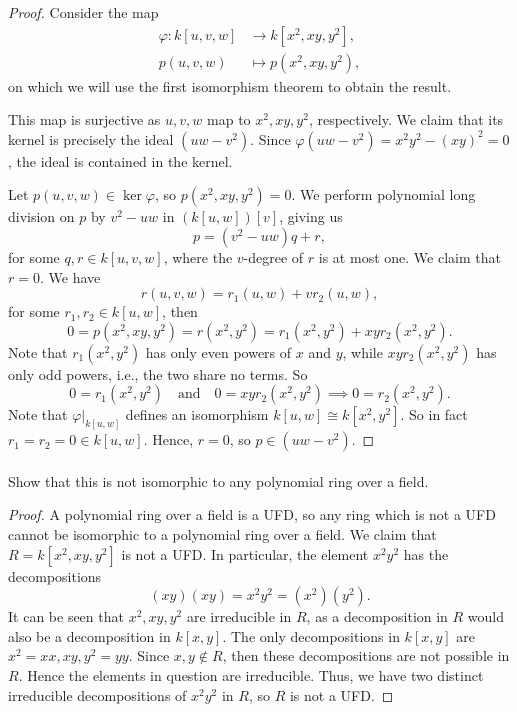 \documentclass[12pt]{article}
\newlength{\myparskip}
\newenvironment{fullbox}{\begin{lrbox}{\savefullbox}\begin{minipage}{\dimexpr\textwidth-2\fboxsep\relax}\setlength{\parskip}{\myparskip}}{\end{minipage}\end{lrbox}\framebox[\textwidth]{\usebox{\savefullbox}}}
\newenvironment{pbox}[1][]{\begin{fullbox}\ifx#1\empty\else\paragraph{#1}\fi}{\end{fullbox}}
\newcommand{\isp}[1]{\quad\text{#1}\quad}
\renewcommand{\phi}{\varphi}
\newcommand{\<}{\langle}
\renewcommand{\>}{\rangle}
\newcommand{\isom}{\cong}
\begin{document}
\begin{proof}
    Consider the map
    \begin{align*}
        \phi : k[u, v, w] &\to k[x^2, xy, y^2], \\
            p(u, v, w) &\mapsto p(x^2, xy, y^2),
    \end{align*}
    on which we will use the first isomorphism theorem to obtain the result.

    This map is surjective as $u, v, w$ map to $x^2, xy, y^2$, respectively. We claim that its kernel is precisely the ideal $(uw - v^2)$. Since $\phi(uw - v^2) = x^2y^2 - (xy)^2 = 0$, the ideal is contained in the kernel.
    
    Let $p(u, v, w) \in \ker\phi$, so $p(x^2, xy, y^2) = 0$. We perform polynomial long division on $p$ by $v^2 - uw$ in $(k[u, w])[v]$, giving us
    \[
        p = (v^2 - uw)q + r,
    \]
    for some $q, r \in k[u, v, w]$, where the $v$-degree of $r$ is at most one. We claim that $r = 0$. We have
    \[
        r(u, v, w) = r_1(u, w) + vr_2(u, w),
    \]
    for some $r_1, r_2 \in k[u, w]$, then
    \[
        0
            = p(x^2, xy, y^2)
            = r(x^2, y^2)
            = r_1(x^2, y^2) + xyr_2(x^2, y^2).
    \]
    Note that $r_1(x^2, y^2)$ has only even powers of $x$ and $y$, while $xyr_2(x^2, y^2)$ has only odd powers, i.e., the two share no terms. So
    \[
        0 = r_1(x^2, y^2) \isp{and} 0 = xyr_2(x^2, y^2) \implies 0 = r_2(x^2, y^2).
    \]
    Note that $\phi|_{k[u, w]}$ defines an isomorphism $k[u, w] \isom k[x^2, y^2]$. So in fact $r_1 = r_2 = 0 \in k[u, w]$. Hence, $r = 0$, so $p \in (uw - v^2)$.

\end{proof}

\begin{pbox}
    Show that this is not isomorphic to any polynomial ring over a field.
\end{pbox}

\begin{proof}
    A polynomial ring over a field is a UFD, so any ring which is not a UFD cannot be isomorphic to a polynomial ring over a field. We claim that $R = k[x^2, xy, y^2]$ is not a UFD. In particular, the element $x^2y^2$ has the decompositions
    \[
        (xy)(xy) = x^2y^2 = (x^2)(y^2).
    \]
    It can be seen that $x^2, xy, y^2$ are irreducible in $R$, as a decomposition in $R$ would also be a decomposition in $k[x, y]$. The only decompositions in $k[x, y]$ are $x^2 = xx, xy, y^2 = yy$. Since $x, y \notin R$, then these decompositions are not possible in $R$. Hence the elements in question are irreducible. Thus, we have two distinct irreducible decompositions of $x^2y^2$ in $R$, so $R$ is not a UFD.
\end{proof}
\end{document}
